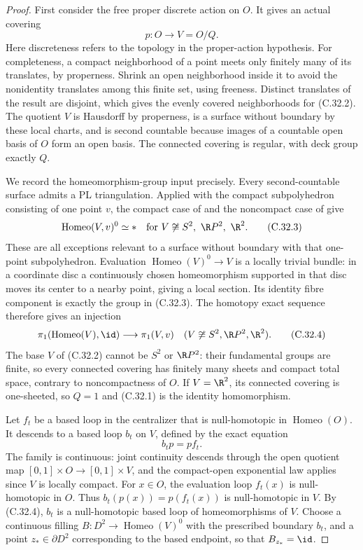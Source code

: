 \begin{proof}
First consider the free proper discrete action on $O$. It gives an
actual covering
\[
                       p:O\longrightarrow V=O/Q.          \tag{C.32.2}
\]
Here discreteness refers to the topology in the proper-action
hypothesis. For completeness, a compact neighborhood of a point
meets only finitely many of its translates, by properness. Shrink
an open neighborhood inside it to avoid the nonidentity translates
among this finite set, using freeness. Distinct translates of the
result are disjoint, which gives the evenly covered neighborhoods
for (C.32.2). The quotient $V$ is Hausdorff by properness, is a
surface without boundary by these local charts, and is second
countable because images of a countable open basis of $O$ form an
open basis. The connected covering is regular, with deck group
exactly $Q$.

We record the homeomorphism-group input precisely. Every
second-countable surface admits a PL triangulation. Applied with
the compact subpolyhedron consisting of one point $v$, the compact
case of \cite[Lemma~2.1]{C_Yagasaki2000} and the noncompact case of
\cite[Theorem~1.1]{C_Yagasaki2000} give
\[
 \operatorname{Homeo}(V,v)^0\simeq *
 \quad\text{for }V\not\cong S^2,\ \R P^2,\ \R^2.          \tag{C.32.3}
\]
These are all exceptions relevant to a surface without boundary
with that one-point subpolyhedron. Evaluation
$\operatorname{Homeo}(V)^0\to V$ is a locally trivial bundle:
in a coordinate disc a continuously chosen homeomorphism supported
in that disc moves its center to a nearby point, giving a local
section. Its identity fibre component is exactly the group in
(C.32.3). The homotopy exact sequence therefore gives an injection
\[
 \pi_1(\operatorname{Homeo}(V),\id)
          \longrightarrow\pi_1(V,v)
       \quad(V\not\cong S^2,\R P^2,\R^2).                \tag{C.32.4}
\]
The base $V$ of (C.32.2) cannot be $S^2$ or $\R P^2$:
their fundamental groups are finite, so every connected covering
has finitely many sheets and compact total space, contrary to
noncompactness of $O$. If $V=\R^2$, its connected covering is
one-sheeted, so $Q=1$ and (C.32.1) is the identity homomorphism.

Let $f_t$ be a based loop in the centralizer that is null-homotopic
in $\operatorname{Homeo}(O)$. It descends to a based loop $b_t$
on $V$, defined by the exact equation
\[
                         b_t p=p f_t.                    \tag{C.32.5}
\]
The family is continuous: joint continuity descends through the
open quotient map $[0,1]\times O\to[0,1]\times V$, and the
compact-open exponential law applies since $V$ is locally compact.
For $x\in O$, the evaluation loop $f_t(x)$ is null-homotopic in
$O$. Thus $b_t(p(x))=p(f_t(x))$ is null-homotopic in $V$.
By (C.32.4), $b_t$ is a null-homotopic based loop of homeomorphisms
of $V$. Choose a continuous filling
$B:D^2\to\operatorname{Homeo}(V)^0$ with the prescribed boundary
$b_t$, and a point $z_*\in\partial D^2$ corresponding to the based
endpoint, so that $B_{z_*}=\id$.


\end{proof}
